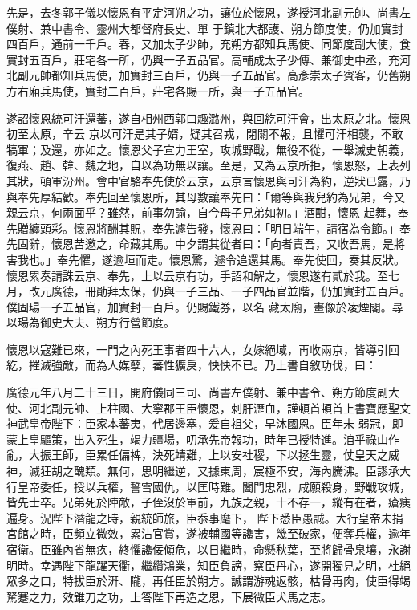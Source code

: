 \begin{pinyinscope}
 先是，去冬郭子儀以懷恩有平定河朔之功，讓位於懷恩，遂授河北副元帥、尚書左僕射、兼中書令、靈州大都督府長史、單
 于鎮北大都護、朔方節度使，仍加實封四百戶，通前一千戶。春，又加太子少師，充朔方都知兵馬使、同節度副大使，食實封五百戶，莊宅各一所，仍與一子五品官。高輔成太子少傅、兼御史中丞，充河北副元帥都知兵馬使，加實封三百戶，仍與一子五品官。高彥崇太子賓客，仍舊朔方右廂兵馬使，實封二百戶，莊宅各賜一所，與一子五品官。



 遂詔懷恩統可汗還蕃，遂自相州西郭口趣潞州，與回紇可汗會，出太原之北。懷恩初至太原，辛云
 京以可汗是其子婿，疑其召戎，閉關不報，且懼可汗相襲，不敢犒軍；及還，亦如之。懷恩父子宣力王室，攻城野戰，無役不從，一舉滅史朝義，復燕、趙、韓、魏之地，自以為功無以讓。至是，又為云京所拒，懷恩怒，上表列其狀，頓軍汾州。會中官駱奉先使於云京，云京言懷恩與可汗為約，逆狀已露，乃與奉先厚結歡。奉先回至懷恩所，其母數讓奉先曰：「爾等與我兒約為兄弟，今又親云京，何兩面乎？雖然，前事勿諭，自今母子兄弟如初。」酒酣，懷恩
 起舞，奉先贈纏頭彩。懷恩將酬其貺，奉先遽告發，懷恩曰：「明日端午，請宿為令節。」奉先固辭，懷恩苦邀之，命藏其馬。中夕謂其從者曰：「向者責吾，又收吾馬，是將害我也。」奉先懼，遂逾垣而走。懷恩驚，遽令追還其馬。奉先使回，奏其反狀。懷恩累奏請誅云京、奉先，上以云京有功，手詔和解之，懷恩遂有貳於我。至七月，改元廣德，冊勛拜太保，仍與一子三品、一子四品官並階，仍加實封五百戶。僕固瑒一子五品官，加實封一百戶。仍賜鐵券，以名
 藏太廟，畫像於凌煙閣。尋以瑒為御史大夫、朔方行營節度。



 懷恩以寇難已來，一門之內死王事者四十六人，女嫁絕域，再收兩京，皆導引回紇，摧滅強敵，而為人媒孽，蕃性獷戾，怏怏不已。乃上書自敘功伐，曰：



 廣德元年八月二十三日，開府儀同三司、尚書左僕射、兼中書令、朔方節度副大使、河北副元帥、上柱國、大寧郡王臣懷恩，刺肝瀝血，謹頓首頓首上書寶應聖文神武皇帝陛下：臣家本蕃夷，代居邊塞，爰自祖父，早沐國恩。臣年未
 弱冠，即蒙上皇驅策，出入死生，竭力疆場，叨承先帝報功，時年已授特進。洎乎祿山作亂，大振王師，臣累任偏裨，決死靖難，上以安社稷，下以拯生靈，仗皇天之威神，滅狂胡之醜類。無何，思明繼逆，又據東周，宸極不安，海內騰沸。臣謬承大行皇帝委任，授以兵權，誓雪國仇，以匡時難。闔門忠烈，咸願殺身，野戰攻城，皆先士卒。兄弟死於陣敵，子侄沒於軍前，九族之親，十不存一，縱有在者，瘡痍遍身。況陛下潛龍之時，親統師旅，臣忝事麾下，
 陛下悉臣愚誠。大行皇帝未捐宮館之時，臣頻立微效，累沾官賞，遂被輔國等讒害，幾至破家，便奪兵權，逾年宿衛。臣雖內省無疚，終懼讒佞傾危，以日繼時，命懸秋葉，至將歸骨泉壤，永謝明時。幸遇陛下龍躍天衢，繼纘鴻業，知臣負謗，察臣丹心，遂開獨見之明，杜絕眾多之口，特拔臣於汧、隴，再任臣於朔方。誠謂游魂返骸，枯骨再肉，使臣得竭駑蹇之力，效錐刀之功，上答陛下再造之恩，下展微臣犬馬之志。




\end{pinyinscope}
